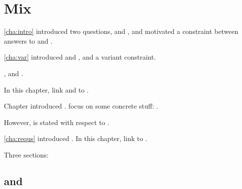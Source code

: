 \chapter{Mix}
\label{cha:binding}

\begin{note}
  \autoref{cha:intro} introduced two questions, \qWhy{} and \qHow{}, and motivated a constraint between answers to \qWhy{} and \qHow{}.

  \autoref{cha:var} introduced \qWhyV{} and \qHowV{}, and a variant constraint.

  \fc{}, and \requ{}.

  In this chapter, link  and  to \qWhyV{}.
\end{note}

\begin{note}
  Chapter introduced .
   focus on some concrete stuff: .

  However, \qWhyV{} is stated with respect to \ros{}.
\end{note}


\begin{note}
  \autoref{cha:requs} introduced .
  In this chapter, link  to \qWhyV{}.
\end{note}

\begin{note}
  Three sections:
  \begin{TOCEnum}
  \item
  \item
  \item
  \end{TOCEnum}
\end{note}

\section{ and }
\label{cha:binding:sec:requRos}

